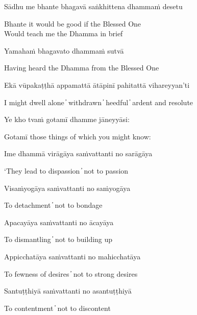 Sādhu me bhante bhagavā saṅkhittena dhammaṁ desetu

\begin{cprenglish}
Bhante it would be good if the Blessed One\\
Would teach me the Dhamma in brief
\end{cprenglish}

Yamahaṁ bhagavato dhammaṁ sutvā

\begin{cprenglish}
Having heard the Dhamma from the Blessed One
\end{cprenglish}

Ekā vūpakaṭṭhā appamattā ātāpinī pahitattā vihareyyan’ti

\begin{cprenglish}
I might dwell alone  ̓  withdrawn  ̓  heedful  ̓  ardent and resolute
\end{cprenglish}

Ye kho tvaṁ gotamī dhamme jāneyyāsi:

\begin{cprenglish}
Gotamī those things of which you might know:
\end{cprenglish}

Ime dhammā virāgāya saṁvattanti no sarāgāya

\begin{cprenglish}
‘They lead to dispassion  ̓  not to passion
\end{cprenglish}

Visaṁyogāya saṁvattanti no saṁyogāya

\begin{cprenglish}
To detachment  ̓  not to bondage
\end{cprenglish}

Apacayāya saṁvattanti no ācayāya

\begin{cprenglish}
To dismantling  ̓  not to building up
\end{cprenglish}

Appicchatāya saṁvattanti no mahicchatāya

\begin{cprenglish}
To fewness of desires  ̓  not to strong desires
\end{cprenglish}

Santuṭṭhiyā saṁvattanti no asantuṭṭhiyā

\begin{cprenglish}
To contentment  ̓  not to discontent
\end{cprenglish}

